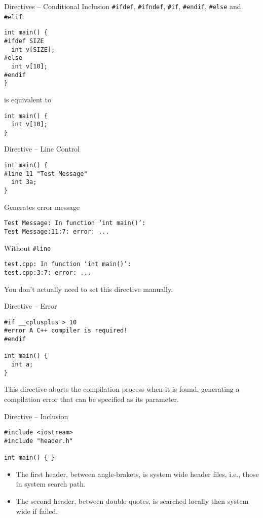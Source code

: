 \documentclass[presentation]{beamer}
\begin{document}
\begin{frame}[fragile,label={sec:orgheadline46}]{Directives -- Conditional Inclusion}
 \texttt{\#ifdef}, \texttt{\#ifndef}, \texttt{\#if}, \texttt{\#endif}, \texttt{\#else} and \texttt{\#elif}.

\begin{verbatim}
int main() {
#ifdef SIZE
  int v[SIZE];
#else
  int v[10];
#endif
}
\end{verbatim}

is equivalent to

\begin{verbatim}
int main() {
  int v[10];
}
\end{verbatim}
\end{frame}

\begin{frame}[fragile,label={sec:orgheadline47}]{Directive -- Line Control}
 \begin{verbatim}
int main() {
#line 11 "Test Message"
  int 3a;
}
\end{verbatim}

Generates error message

\begin{verbatim}
Test Message: In function ‘int main()’:
Test Message:11:7: error: ...
\end{verbatim}

Without \texttt{\#line}

\begin{verbatim}
test.cpp: In function ‘int main()’:
test.cpp:3:7: error: ...
\end{verbatim}

You don't actually need to set this directive manually.
\end{frame}

\begin{frame}[fragile,label={sec:orgheadline48}]{Directive -- Error}
 \begin{verbatim}
#if __cplusplus > 10
#error A C++ compiler is required!
#endif

int main() {
  int a;
}
\end{verbatim}

This directive aborts the compilation process when it is found,
generating a compilation error that can be specified as its
parameter.
\end{frame}

\begin{frame}[fragile,label={sec:orgheadline49}]{Directive -- Inclusion}
 \begin{verbatim}
#include <iostream>
#include "header.h"

int main() { }
\end{verbatim}

\begin{itemize}
\item The first header, between angle-brakets, is system wide header
files, i.e., those in system search path.
\item The second header, between double quotes, is searched locally
then system wide if failed.
\end{itemize}
\end{frame}
\end{document}
